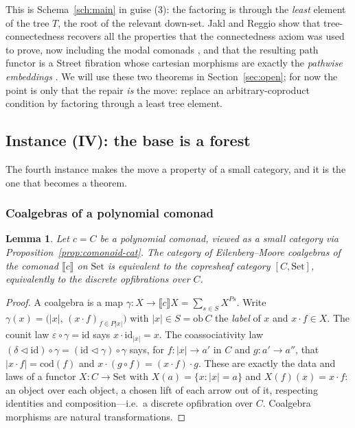 \documentclass[11pt,reqno]{amsart}
\theoremstyle{plain}
\newtheorem{lemma}[theorem]{Lemma}
\theoremstyle{definition}
\newcommand{\Set}{\mathrm{Set}}
\newcommand{\ob}{\mathrm{ob}}
\newcommand{\cod}{\mathrm{cod}}
\newcommand{\id}{\mathrm{id}}
\newcommand{\sem}[1]{\llbracket #1 \rrbracket}
\newcommand{\cext}[1]{\sem{#1}}
\begin{document}
This is Schema~\ref{sch:main} in guise (3): the factoring is through the \emph{least} element of the tree
$T$, the root of the relevant down-set. Jakl and Reggio show that tree-connectedness recovers all the
properties that the connectedness axiom was used to prove, now including the modal comonads
\cite[Lem.~12]{JaklReggio2026}, and that the resulting path functor is a Street fibration whose cartesian
morphisms are exactly the \emph{pathwise embeddings} \cite[Thm.~23, Thm.~26]{JaklReggio2026}. We will use
these two theorems in Section~\ref{sec:open}; for now the point is only that the repair \emph{is} the
move: replace an arbitrary-coproduct condition by factoring through a least tree element.

\subsection{Instance (IV): the base is a forest}\label{sec:forest}
The fourth instance makes the move a property of a small category, and it is the one that becomes a
theorem.

\subsubsection{Coalgebras of a polynomial comonad}
\begin{lemma}\label{lem:coalg}
Let $c = C$ be a polynomial comonad, viewed as a small category via
Proposition~\ref{prop:comonoid-cat}. The category of Eilenberg--Moore coalgebras of the comonad
$\cext{c}$ on $\Set$ is equivalent to the copresheaf category $[C,\Set]$, equivalently to the discrete
opfibrations over $C$.
\end{lemma}

\begin{proof}
A coalgebra is a map $\gamma : X \to \cext{c}X = \sum_{s \in S} X^{P s}$. Write
$\gamma(x) = \big(|x|,\, (x \cdot f)_{f \in P|x|}\big)$ with $|x| \in S = \ob\, C$ the \emph{label} of $x$
and $x \cdot f \in X$. The counit law $\varepsilon \circ \gamma = \id$ says $x \cdot \id_{|x|} = x$. The
coassociativity law $(\delta \triangleleft \id)\circ\gamma = (\id \triangleleft \gamma)\circ\gamma$ says,
for $f : |x| \to a'$ in $C$ and $g : a' \to a''$, that $|x \cdot f| = \cod(f)$ and
$x \cdot (g \circ f) = (x \cdot f)\cdot g$. These are exactly the data and laws of a functor
$X : C \to \Set$ with $X(a) = \{x : |x| = a\}$ and $X(f)(x) = x \cdot f$: an object over each object, a chosen
lift of each arrow out of it, respecting identities and composition---i.e.\ a discrete opfibration over
$C$. Coalgebra morphisms are natural transformations.
\end{proof}
\end{document}
